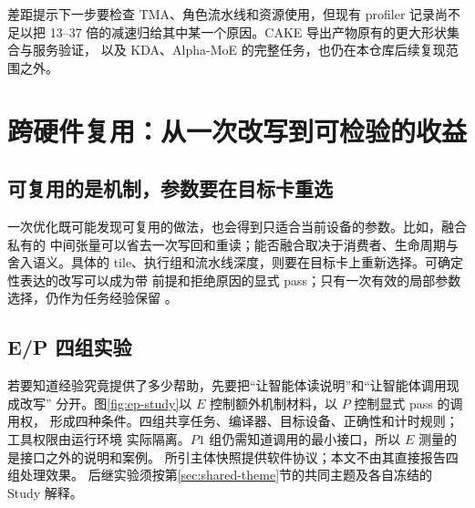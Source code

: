 \documentclass[UTF8,11pt,a4paper,fontset=none]{ctexart}
\begin{document}
差距提示下一步要检查 TMA、角色流水线和资源使用，但现有 profiler 记录尚不足以把
13--37 倍的减速归给其中某一个原因。CAKE 导出产物原有的更大形状集合与服务验证，
以及 KDA、Alpha-MoE 的完整任务，也仍在本仓库后续复现范围之外\cite{cakecomparison}。

\section{跨硬件复用：从一次改写到可检验的收益}

\subsection{可复用的是机制，参数要在目标卡重选}
一次优化既可能发现可复用的做法，也会得到只适合当前设备的参数。比如，融合私有的
中间张量可以省去一次写回和重读；能否融合取决于消费者、生命周期与舍入语义。具体的
tile、执行组和流水线深度，则要在目标卡上重新选择。可确定性表达的改写可以成为带
前提和拒绝原因的显式 pass；只有一次有效的局部参数选择，仍作为任务经验保留
\cite{transfer}。

\subsection{E/P 四组实验}
若要知道经验究竟提供了多少帮助，先要把“让智能体读说明”和“让智能体调用现成改写”
分开。图\ref{fig:ep-study}以 $E$ 控制额外机制材料，以 $P$ 控制显式 pass 的调用权，
形成四种条件。四组共享任务、编译器、目标设备、正确性和计时规则；工具权限由运行环境
实际隔离。$P1$ 组仍需知道调用的最小接口，所以 $E$ 测量的是接口之外的说明和案例。
所引主体快照提供软件协议；本文不由其直接报告四组处理效果\cite{study}。
后继实验须按第\ref{sec:shared-theme}节的共同主题及各自冻结的 Study 解释。
\end{document}

